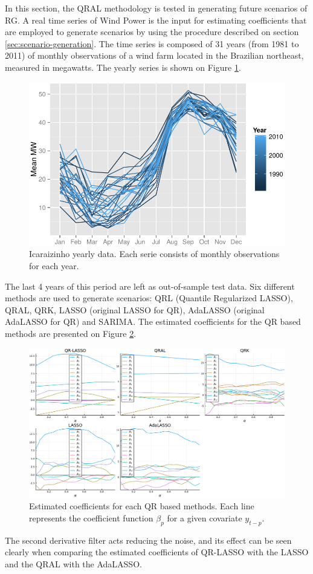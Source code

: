 In this section, the QRAL methodology is tested in generating future scenarios of RG. A real time series of Wind Power is the input for estimating coefficients that are employed to generate scenarios by using the procedure described on section \ref{sec:scenario-generation}.
The time series is composed of 31 years (from 1981 to 2011) of monthly observations  of a wind farm located in the Brazilian northeast, measured in megawatts. The yearly series is shown on Figure \ref{fig:icaraizinho-mensal}.
\begin{figure}[h]
\centering
\includegraphics[width=0.8\linewidth]{Images/icaraizinho-mensal2}
\caption{Icaraizinho yearly data. Each serie consists of monthly observations for each year.}
\label{fig:icaraizinho-mensal}
\end{figure}

The last 4 years of this period are left as out-of-sample test data. Six different methods are used to generate scenarios: QRL (Quantile Regularized LASSO), QRAL, QRK, LASSO (original LASSO for QR), AdaLASSO (original AdaLASSO for QR) and SARIMA. The estimated coefficients for the QR based methods are presented on Figure \ref{fig:betas-icaraizinho}. 
\begin{figure}[h]
	\centering
	\includegraphics[width=1.0\linewidth]{Images/betas-icaraizinho}
	\caption{Estimated coefficients for each QR based methods. Each line represents the coefficient function $\beta_{p}$ for a given covariate $y_{t-p}$.}
	\label{fig:betas-icaraizinho}
\end{figure}
The second derivative filter acts reducing the noise, and its effect can be seen clearly when comparing the estimated coefficients of QR-LASSO with the LASSO and the QRAL with the AdaLASSO. 

